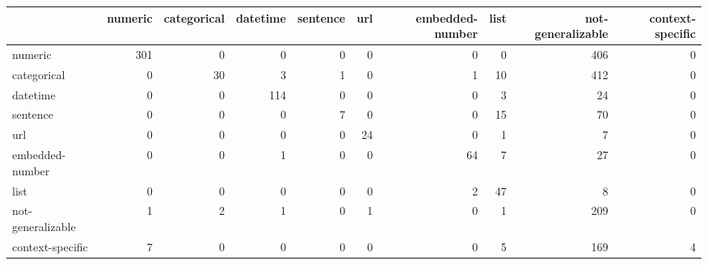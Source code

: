 \begin{tabular}{lrrrrrrrrr}
\toprule
{} &  numeric &  categorical &  datetime &  sentence &  url &  embedded-number &  list &  not-generalizable &  context-specific \\
\midrule
numeric           &      301 &            0 &         0 &         0 &    0 &                0 &     0 &                406 &                 0 \\
categorical       &        0 &           30 &         3 &         1 &    0 &                1 &    10 &                412 &                 0 \\
datetime          &        0 &            0 &       114 &         0 &    0 &                0 &     3 &                 24 &                 0 \\
sentence          &        0 &            0 &         0 &         7 &    0 &                0 &    15 &                 70 &                 0 \\
url               &        0 &            0 &         0 &         0 &   24 &                0 &     1 &                  7 &                 0 \\
embedded-number   &        0 &            0 &         1 &         0 &    0 &               64 &     7 &                 27 &                 0 \\
list              &        0 &            0 &         0 &         0 &    0 &                2 &    47 &                  8 &                 0 \\
not-generalizable &        1 &            2 &         1 &         0 &    1 &                0 &     1 &                209 &                 0 \\
context-specific  &        7 &            0 &         0 &         0 &    0 &                0 &     5 &                169 &                 4 \\
\bottomrule
\end{tabular}
